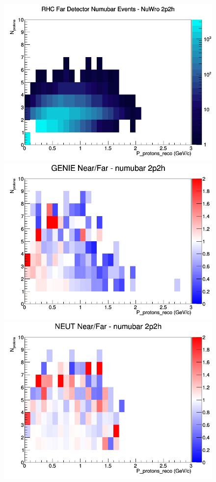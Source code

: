 \begin{figure}[h]
\endminipage
{}
\includegraphics[width=\linewidth]{eff_N_P/LAr/protons/2p2h_RHC_FD_numubar_N_P_NuWro.png}
\endminipage
\newline
{}
\includegraphics[width=\linewidth]{eff_N_P/LAr/protons/ratios/2p2h_GENIE_numubar_NF_N_P.png}
\endminipage
{}
\includegraphics[width=\linewidth]{eff_N_P/LAr/protons/ratios/2p2h_NEUT_numubar_NF_N_P.png}

\end{figure}

